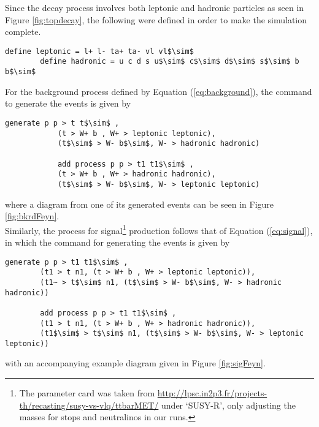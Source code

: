 Since the decay process involves both leptonic and hadronic particles as seen in Figure \ref{fig:topdecay}, the following were defined in order to make the simulation complete. \\

\begin{lstlisting}[mathescape = true]
        define leptonic = l+ l- ta+ ta- vl vl$\sim$
        define hadronic = u c d s u$\sim$ c$\sim$ d$\sim$ s$\sim$ b b$\sim$
\end{lstlisting}

For the background process defined by Equation (\ref{eq:background}), the command to generate the events is given by
\begin{lstlisting}[mathescape = true]
            generate p p > t t$\sim$ , 
            (t > W+ b , W+ > leptonic leptonic), 
            (t$\sim$ > W- b$\sim$, W- > hadronic hadronic)
        
            add process p p > t1 t1$\sim$ ,
            (t > W+ b , W+ > hadronic hadronic), 
            (t$\sim$ > W- b$\sim$, W- > leptonic leptonic)
\end{lstlisting}
where a diagram from one of its generated events can be seen in Figure \ref{fig:bkrdFeyn}. \\

Similarly, the process for signal\footnote{The parameter card was taken from \url{http://lpsc.in2p3.fr/projects-th/recasting/susy-vs-vlq/ttbarMET/} \cite{kraml2016scalar} under `SUSY-R', only adjusting the masses for stops and neutralinos in our runs.} production follows that of Equation (\ref{eq:signal}), in which the command for generating the events is given by
\begin{lstlisting}[mathescape = true]
        generate p p > t1 t1$\sim$ ,
        (t1 > t n1, (t > W+ b , W+ > leptonic leptonic)),
        (t1~ > t$\sim$ n1, (t$\sim$ > W- b$\sim$, W- > hadronic hadronic))
        
        add process p p > t1 t1$\sim$ , 
        (t1 > t n1, (t > W+ b , W+ > hadronic hadronic)), 
        (t1$\sim$ > t$\sim$ n1, (t$\sim$ > W- b$\sim$, W- > leptonic leptonic))
\end{lstlisting}
with an accompanying example diagram given in Figure \ref{fig:sigFeyn}. \\

